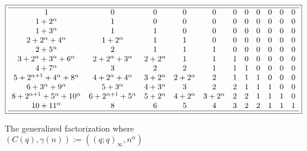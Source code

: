 \documentclass[10pt,reqno]{amsart}
\numberwithin{figure}{section}
\numberwithin{table}{section}
\theoremstyle{plain}
\numberwithin{theorem}{section}
\theoremstyle{remark}
\begin{document}
\begin{figure}[ht!]
\begin{minipage}{\linewidth} 
\begin{center} 
\tiny 
\begin{equation*} 
\boxed{ 
\begin{array}{cccccccccccccccccc} \hline 
 1 & 0 & 0 & 0 & 0 & 0 & 0 & 0 & 0 & 0 & 0 \\
 1+2^{\alpha } & 1 & 0 & 0 & 0 & 0 & 0 & 0 & 0 & 0 & 0 \\
 1+3^{\alpha } & 1 & 1 & 0 & 0 & 0 & 0 & 0 & 0 & 0 & 0 \\
 2+2^{\alpha }+4^{\alpha } & 1+2^{\alpha } & 1 & 1 & 0 & 0 & 0 & 0 & 0 & 0 & 0 \\
 2+5^{\alpha } & 2 & 1 & 1 & 1 & 0 & 0 & 0 & 0 & 0 & 0 \\
 3+2^{\alpha }+3^{\alpha }+6^{\alpha } & 2+2^{\alpha }+3^{\alpha } & 2+2^{\alpha } & 1 & 1 & 1 & 0 & 0 & 0 & 0 & 0 \\
 4+7^{\alpha } & 3 & 2 & 2 & 1 & 1 & 1 & 0 & 0 & 0 & 0 \\
 5+2^{\alpha +1}+4^{\alpha }+8^{\alpha } & 4+2^{\alpha }+4^{\alpha } & 3+2^{\alpha } & 2+2^{\alpha } & 2 & 1 & 1 & 1 & 0 & 0 & 0 \\
 6+3^{\alpha }+9^{\alpha } & 5+3^{\alpha } & 4+3^{\alpha } & 3 & 2 & 2 & 1 & 1 & 1 & 0 & 0 \\
 8+2^{\alpha +1}+5^{\alpha }+10^{\alpha } & 6+2^{\alpha +1}+5^{\alpha } & 5+2^{\alpha } & 4+2^{\alpha } & 3+2^{\alpha } & 2 & 2 & 1 & 1 & 1 & 0 \\
 10+11^{\alpha } & 8 & 6 & 5 & 4 & 3 & 2 & 2 & 1 & 1 & 1 \\
 \hline 
\end{array}
} 
\end{equation*} 
\end{center} 
\end{minipage}

\caption{The generalized factorization where $(C(q), \gamma(n)) := ((q; q)_{\infty}, n^{\alpha})$} 
\label{figure_genfactpair_spcase_v2} 

\end{figure} 
\end{document}
